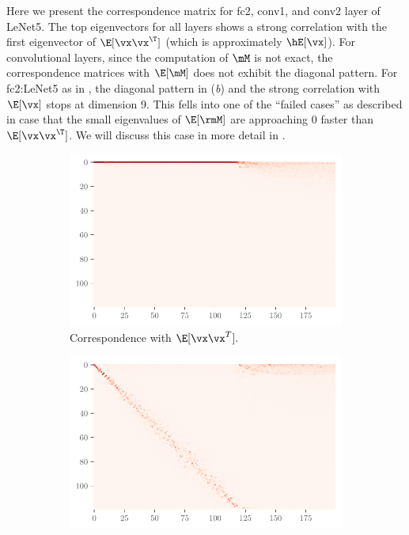 Here we present the correspondence matrix for fc2, conv1, and conv2 layer of LeNet5. The top eigenvectors for all layers shows a strong correlation with the first eigenvector of $\E[\vx\vx^\T]$ (which is approximately $\hE[\vx]$). For convolutional layers, since the computation of $\mM$ is not exact, the correspondence matrices with $\E[\mM]$ does not exhibit the diagonal pattern. For fc2:LeNet5 as in , the diagonal pattern in (\emph{b}) and the strong correlation with $\E[\vx]$ stops at dimension 9. This fells into one of the ``failed cases'' as described in  case that the small eigenvalues of $\E[\rmM]$ are approaching $0$ faster than $\E[\vx\vx^\T]$. We will discuss this case in more detail in .


\begin{figure}[H]
    \centering
    \begin{subfigure}[t]{0.5\textwidth}
        \centering
        \captionsetup{justification=centering}
        \includegraphics[width=\textwidth]{Figures/Correspondence/LeNet5_fixlr0.01/xxT_Trueest_real_corr_expand_t200_CIFAR10_Exp1_LeNet5_fixlr0.01R2_E-1_fc1.pdf}
        \caption{Correspondence with $\E[\vx\vx^T].$}
        \label{fig:Corr_xxT_True_fc1}
    \end{subfigure}%
    \begin{subfigure}[t]{0.5\textwidth}
        \centering
        \captionsetup{justification=centering}
        \includegraphics[width=\textwidth]{Figures/Correspondence/LeNet5_fixlr0.01/UTAU_Trueest_real_corr_expand_t200_CIFAR10_Exp1_LeNet5_fixlr0.01R2_E-1_fc1.pdf}

\end{subfigure}
\end{figure}
